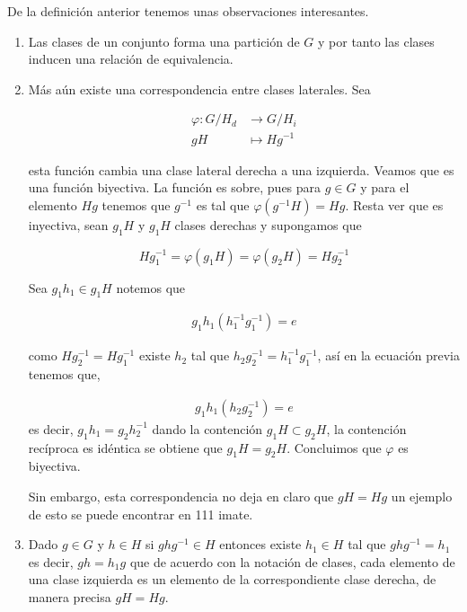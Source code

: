 	
\begin{ob}
	De la definición anterior tenemos unas observaciones interesantes. 
	\begin{enumerate}
	
	\item Las clases de un conjunto forma una partición de $G$ y por tanto las clases inducen una relación de equivalencia.
	
	\item Más aún existe una correspondencia entre clases laterales. 
 Sea 

\begin{align*}
\varphi:G/H_d & \to G/H_i \\
gH & \mapsto Hg^{-1}
\end{align*} 
 
  esta función cambia una clase lateral derecha a una izquierda. Veamos que es una función biyectiva. La función es sobre, pues para $g \in G$ y para el elemento $Hg$ tenemos que $g^{-1}$ es tal que $\varphi(g^{-1}H)=Hg$. Resta ver que es inyectiva, sean $g_1H$ y $g_1H$ clases derechas y supongamos que
	
	 $$Hg_1^{-1}=\varphi(g_1H)=\varphi(g_2H)=Hg_2^{-1}$$ 
	
	Sea $g_1h_1 \in g_1H$ notemos que

	\begin{align*}
	g_1h_1(h_1^{-1}g_1^{-1})=e	
	\end{align*}
	
	como $Hg_2^{-1}=Hg_1^{-1}$ existe $h_2$ tal que $h_2g_2^{-1}=h_1^{-1}g_1^{-1}$, así en la ecuación previa tenemos que, 
	
	\begin{align*}
	g_1h_1(h_2g_2^{-1})=e	
	\end{align*} 
	es decir, $g_1h_1=g_2h_2^{-1}$ dando la contención $g_1H \subset g_2H$, la contención recíproca es idéntica se obtiene que $g_1H=g_2H$. Concluimos que $\varphi$ es biyectiva. 
	
	Sin embargo, esta correspondencia no deja en claro que $gH=Hg$ un ejemplo de esto se puede encontrar en 111 imate.
	
	 \item Dado $g \in G$ y $h \in H$ si $ghg^{-1} \in H$ entonces existe $h_1 \in H$ tal que $ghg^{-1}=h_1$ es decir, $gh=h_1g$  que de acuerdo con la notación de clases, cada elemento de una clase izquierda es un elemento de la correspondiente clase derecha, de manera precisa $gH=Hg$.
	 \end{enumerate}
	\end{ob}
	
